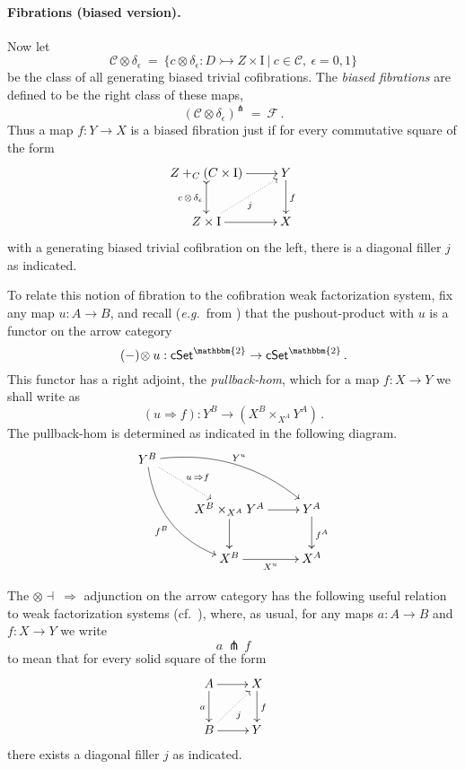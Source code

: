 \documentclass[11pt]{amsart}
\newcommand{\eg}{\emph{e.g.}}
\newcommand{\cSet}{\ensuremath{\mathsf{cSet}}}
\newcommand{\mono}{\ensuremath{\rightarrowtail}}
\newcommand{\ra}{\ensuremath{\rightarrow}}
\renewcommand{\to}{\ensuremath{\rightarrow}}
\newcommand{\too}{\ensuremath{\longrightarrow}}
\newcommand{\I}{\ensuremath{\mathrm{I}}}
\theoremstyle{remark}
\theoremstyle{definition}
\begin{document}
\paragraph{Fibrations (biased version).}
Now let 
\[
\mathcal{C}\otimes \delta_\epsilon\ =\ \{ c \otimes \delta_\epsilon : D \mono Z \times \I\ |\ c \in\mathcal{C},\ \epsilon = 0,1 \}
\]
be the class of all generating biased trivial cofibrations.
The \emph{biased fibrations} are defined to be the right class of these maps,
\[
(\mathcal{C}\otimes \delta_\epsilon)^\pitchfork\ =\ \mathcal{F}\,.
\]
Thus a map $f : Y\ra X$ is a biased fibration just if for every commutative square of the form
\begin{equation}\label{diagram:biasedfillers}
\xymatrix{
Z +_C (C\times\I) \ar@{>->}[d]_{c\, \otimes\, \delta_\epsilon} \ar[r] & Y \ar[d]^f \\
Z\times \I \ar@{.>}[ru]_{j} \ar[r] & X
}
\end{equation}
with a generating biased trivial cofibration on the left, there is a diagonal filler $j$ as indicated. %

To relate this notion of fibration to the cofibration weak factorization system, fix any map $u : A \ra B$, and recall (\eg\ from \cite{JT,R}) that the pushout-product with $u$ is a functor on the arrow category 
\[
(-)\!\otimes u : \cSet^\mathbbm{2} \ra\cSet^\mathbbm{2}\,.
\]
This functor has a right adjoint, the \emph{pullback-hom}, which for a map $f : X\ra Y$ we shall write as
\[
(u \Rightarrow\! f) : Y^B \too (X^B \times_{X^A} Y^A) \,.
\]
The pullback-hom is determined as indicated in the following diagram.
\begin{equation}\label{diagram:pullbackhom}
\xymatrix{
Y^B \ar@/_4ex/[rdd]_{f^B} \ar@{.>}[rd]^{u\, \Rightarrow f} \ar@/^4ex/ [rrd]^{Y^u} && \\
& X^B \times_{X^A} Y^A \ar[d] \ar[r] & Y^A \ar[d]^{f^A} \\
& X^B \ar[r]_{X^u} &  X^A 
}
\end{equation}

The $\otimes\dashv\ \Rightarrow$ adjunction on the arrow category has the following useful relation to weak factorization systems (cf.~\cite{GS,Riehl,JT}), where, as usual, for any maps $a : A \ra B$ and $f : X\ra Y$ we write 
\[
a\, \pitchfork\, f 
\]
to mean that for every solid square of the form
\begin{equation}\label{eq:defpitchfork}
\xymatrix{
A\ar[d]_{a} \ar[r] & X \ar[d]^f \\
B \ar@{.>}[ru]_j \ar[r] & Y
}
\end{equation}
there exists a diagonal filler $j$ as indicated. 
\end{document}
